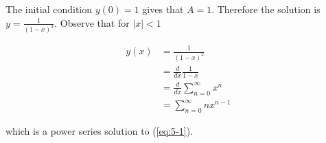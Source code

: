 \documentclass{article}
\begin{document}
The initial condition $y(0) = 1$ gives that $A = 1$. Therefore the solution is $y = \frac{1}{(1 - x)^2}$. Observe that for $|x| < 1$

\begin{align*}
    y(x) &= \frac{1}{(1 - x)^2}\\
    &= \frac{d}{dx}\frac{1}{1 - x}\\
    &= \frac{d}{dx}\sum_{n = 0}^\infty x^n\\
    &= \sum_{n = 0}^\infty nx^{n - 1}
\end{align*}

which is a power series solution to (\ref{eq:5-1}).
\end{document}
